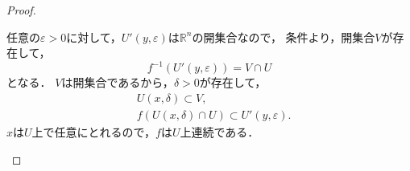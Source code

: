 \documentclass[a4paper,10pt,fleqn]{ltjsarticle}
\begin{document}
\begin{leftbar}
\begin{proof}
\begin{enumerate}[(I)]
                  任意の$\varepsilon >0$に対して，$U'(y,\varepsilon)$は$\mathbb{R}^n$の開集合なので，
                  条件より，開集合$V$が存在して，
                  \[
                      f^{-1} (U'(y,\varepsilon)) = V \cap U
                  \]
                  となる．
                  $V$は開集合であるから，$\delta >0$が存在して，
                  \begin{align*}
                       & U(x,\delta)  \subset V,                          \\
                       & f(U(x,\delta) \cap U) \subset U'(y,\varepsilon).
                  \end{align*}
                  $x$は$U$上で任意にとれるので，$f$は$U$上連続である．
        \end{enumerate}
    \end{proof}
\end{leftbar}
\end{document}
